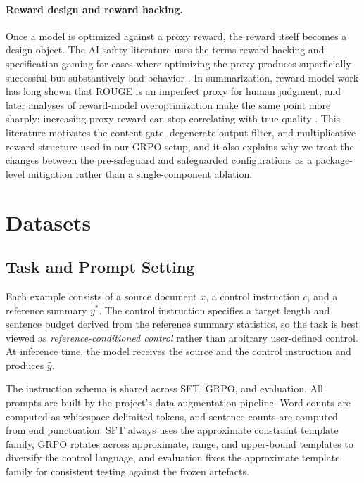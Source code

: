 \documentclass[11pt]{article}
\begin{document}
\paragraph{Reward design and reward hacking.}
Once a model is optimized against a proxy reward, the reward itself becomes a design object.
The AI safety literature uses the terms reward hacking and specification gaming for cases where optimizing the proxy produces superficially successful but substantively bad behavior \citep{amodei2016concrete,skalse2022rewardhacking}.
In summarization, reward-model work has long shown that ROUGE is an imperfect proxy for human judgment, and later analyses of reward-model overoptimization make the same point more sharply: increasing proxy reward can stop correlating with true quality \citep{gao2022scaling}.
This literature motivates the content gate, degenerate-output filter, and multiplicative reward structure used in our GRPO setup, and it also explains why we treat the changes between the pre-safeguard and safeguarded configurations as a package-level mitigation rather than a single-component ablation.

\section{Datasets}

\subsection{Task and Prompt Setting}
Each example consists of a source document $x$, a control instruction $c$, and a reference summary $y^{*}$.
The control instruction specifies a target length and sentence budget derived from the reference summary statistics, so the task is best viewed as \emph{reference-conditioned control} rather than arbitrary user-defined control.
At inference time, the model receives the source and the control instruction and produces $\hat{y}$.

The instruction schema is shared across SFT, GRPO, and evaluation.
All prompts are built by the project's data augmentation pipeline.
Word counts are computed as whitespace-delimited tokens, and sentence counts are computed from end punctuation.
SFT always uses the approximate constraint template family, GRPO rotates across approximate, range, and upper-bound templates to diversify the control language, and evaluation fixes the approximate template family for consistent testing against the frozen artefacts.
\end{document}
